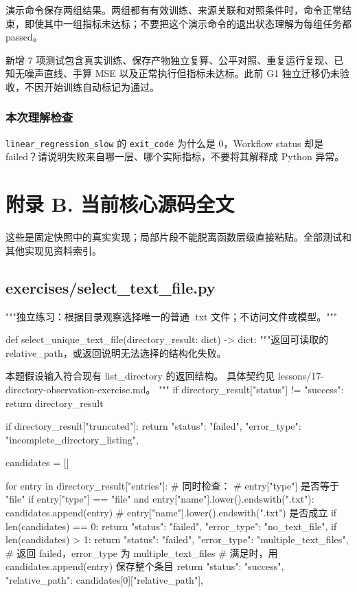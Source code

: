 \documentclass[UTF8,zihao=-4,fontset=fandol]{ctexart}
\begin{document}
演示命令保存两组结果。两组都有有效训练、来源关联和对照条件时，命令正常结束，即使其中一组指标未达标；不要把这个演示命令的退出状态理解为每组任务都 passed。

新增 7 项测试包含真实训练、保存产物独立复算、公平对照、重复运行复现、已知无噪声直线、手算 MSE 以及正常执行但指标未达标。此前 G1 独立迁移仍未验收，不因开始训练自动标记为通过。

\subsubsection{本次理解检查}

\nolinkurl{linear_regression_slow} 的 \nolinkurl{exit_code} 为什么是 0，Workflow status 却是 failed？请说明失败来自哪一层、哪个实际指标，不要将其解释成 Python 异常。

\section{附录 B. 当前核心源码全文}
这些是固定快照中的真实实现；局部片段不能脱离函数层级直接粘贴。全部测试和其他实现见资料索引。

\subsection{exercises/select\_text\_file.py}

\begin{Code}
"""独立练习：根据目录观察选择唯一的普通 .txt 文件；不访问文件或模型。"""


def select_unique_text_file(directory_result: dict) -> dict:
    """返回可读取的 relative_path，或返回说明无法选择的结构化失败。

    本题假设输入符合现有 list_directory 的返回结构。
    具体契约见 lessons/17-directory-observation-exercise.md。
    """
    if directory_result["status"] != "success":
        return directory_result

    if directory_result["truncated"]:
        return {
        "status": "failed",
        "error_type": "incomplete_directory_listing",
    }

    candidates = []

    for entry in directory_result["entries"]:
    # 同时检查：
    # entry["type"] 是否等于 "file"
        if entry["type"] == "file" and entry["name"].lower().endswith(".txt"):
            candidates.append(entry)
    # entry["name"].lower().endswith(".txt") 是否成立
    if len(candidates) == 0:
        return {
        "status": "failed",
        "error_type": "no_text_file",
    }
    if len(candidates) > 1:
        return{
                "status": "failed", 
                "error_type": "multiple_text_files",
            }
    # 返回 failed，error_type 为 multiple_text_files
    # 满足时，用 candidates.append(entry) 保存整个条目
    return {
    "status": "success",
    "relative_path": candidates[0]["relative_path"],
}
\end{Code}
\end{document}
